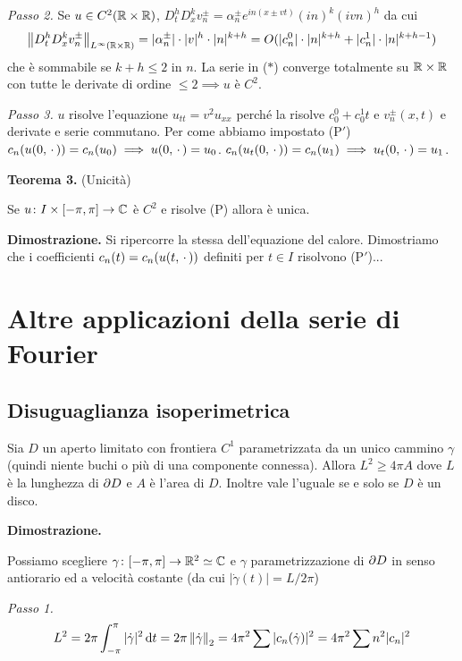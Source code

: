 \textit{Passo 2.}
Se $u \in C^2(\mathbb R \times \mathbb R)$, $D_t^h D_x^k v_n^\pm = \alpha^\pm_n e^{in(x \pm vt)} (in)^k (ivn)^h$ da cui
$$
\left\lVert D_t^h D_x^k v^\pm_n \right\rVert_{L^\infty(\mathbb R \times \mathbb R)} = |\alpha^\pm_n| \cdot |v|^h \cdot |n|^{k+h} 
= O(|c_n^0| \cdot |n|^{k+h} + |c_n^1| \cdot |n|^{k + h - 1}) 
$$
che è sommabile se $k + h \leq 2$ in $n$. La serie in ($*$) converge totalmente su $\mathbb R \times \mathbb R$ con tutte le derivate di ordine $\leq 2 \implies u$ è $C^2$.

\textit{Passo 3.}
$u$ risolve l'equazione $u_{tt} = v^2 u_{xx}$ perché la risolve $c_0^0 + c_0^1 t$ e $v^\pm_n(x, t)$ e derivate e serie commutano. Per come abbiamo impostato (P$'$) $c_n(u(0, \,\cdot\,)) = c_n(u_0) \implies u(0, \,\cdot\,) = u_0$. $c_n(u_t(0, \,\cdot\,)) = c_n(u_1) \implies u_t(0, \,\cdot\,) = u_1$.

\textbf{Teorema 3.}
(Unicità)

Se $u \colon I \times [-\pi, \pi] \to \mathbb C$ è $C^2$ e risolve (P) allora è unica.

\textbf{Dimostrazione.}
Si ripercorre la stessa dell'equazione del calore. Dimostriamo che i coefficienti $c_n(t) = c_n(u(t, \,\cdot\,))$ definiti per $t \in I$ risolvono (P$'$)...

\section{Altre applicazioni della serie di Fourier}

\subsection{Disuguaglianza isoperimetrica}

Sia $D$ un aperto limitato con frontiera $C^1$ parametrizzata da un unico cammino $\gamma$ (quindi niente buchi o più di una componente connessa). Allora $L^2 \geq 4 \pi A$ dove $L$ è la lunghezza di $\partial D$ e $A$ è l'area di $D$. Inoltre vale l'uguale se e solo se $D$ è un disco.

\textbf{Dimostrazione.}

Possiamo scegliere $\gamma \colon [-\pi, \pi] \to \mathbb R^2 \simeq \mathbb C$ e $\gamma$ parametrizzazione di $\partial D$ in senso antiorario ed a velocità costante (da cui $|\dot\gamma(t)| = L / 2\pi$)

\textit{Passo 1.}
$$
L^2 = 2\pi \int_{-\pi}^\pi |\dot \gamma|^2 \,\mathrm{d} t = 2\pi \left\lVert \dot \gamma \right\rVert_2 = 4 \pi^2 \sum |c_n(\dot \gamma)|^2 = 4 \pi^2 \sum n^2 |c_n|^2
$$

